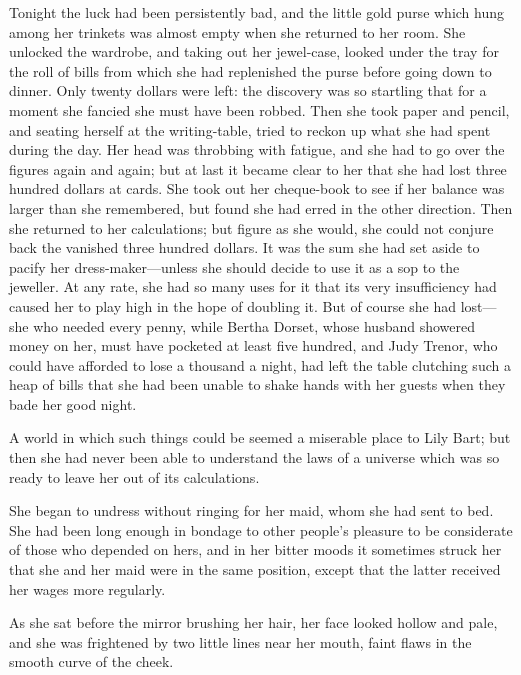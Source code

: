\documentclass[12pt,a4paper]{book}
\begin{document}
Tonight the luck had been persistently bad, and the little gold
purse which hung among her trinkets was almost empty when she
returned to her room. She unlocked the wardrobe, and taking out
her jewel-case, looked under the tray for the roll of bills from
which she had replenished the purse before going down to dinner. 
Only twenty dollars were left: the discovery was so startling
that for a moment she fancied she must have been robbed. Then she
took paper and pencil, and seating herself at the writing-table,
tried to reckon up what she had spent during the day. Her head
was throbbing with fatigue, and she had to go over the figures
again and again; but at last it became clear to her that she had
lost three hundred dollars at cards. She took out her cheque-book
to see if her balance was larger than she remembered, but found
she had erred in the other direction. Then she returned to her
calculations; but figure as she would, she could not conjure back
the vanished three hundred dollars. It was the sum she had set
aside to pacify her dress-maker---unless she should decide to use
it as a sop to the jeweller. At any rate, she had so many
uses for it that its very insufficiency had caused her to play
high in the hope of doubling it. But of course she had lost---she
who needed every penny, while Bertha Dorset, whose husband
showered money on her, must have pocketed at least five hundred,
and Judy Trenor, who could have afforded to lose a thousand a
night, had left the table clutching such a heap of bills that she
had been unable to shake hands with her guests when they bade her
good night.





A world in which such things could be seemed a miserable place to
Lily Bart; but then she had never been able to understand the
laws of a universe which was so ready to leave her out of its
calculations.





She began to undress without ringing for her maid, whom she had
sent to bed. She had been long enough in bondage to other
people's pleasure to be considerate of those who depended on
hers, and in her bitter moods it sometimes struck her that she
and her maid were in the same position, except that the latter
received her wages more regularly.





As she sat before the mirror brushing her hair, her face looked
hollow and pale, and she was frightened by two little lines near
her mouth, faint flaws in the smooth curve of the cheek.
\end{document}
